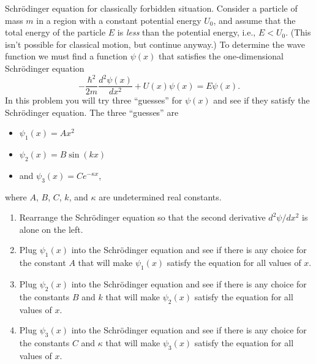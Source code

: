\begin{aproblem}{Schr\"odinger equation for classically forbidden
situation.}  
  Consider a particle of mass $m$ in a region with a constant
  potential energy $U_0$, and assume that the total energy of the
  particle $E$ is {\em less} than the potential energy, i.e., $E<U_0$.
  (This isn't possible for classical motion, but continue anyway.)  To
  determine the wave function we must find a function $\psi(x)$ that
  satisfies the one-dimensional Schr\"{o}dinger equation
  \[ -\frac{\hbar^2}{2m} \frac{d^2\psi(x)}{dx^2} + U(x)\psi(x) 
  = E\psi(x).  
  \]
  In this problem you will try three ``guesses'' for $\psi(x)$ and see
  if they satisfy the Schr\"{o}dinger equation. The three ``guesses''
  are
  \begin{itemize}
  \item $\psi_1(x) = Ax^2$ 
  \item $\psi_2(x) = B\sin(kx)$
  \item and $\psi_3(x) = Ce^{-\kappa x}$,
  \end{itemize}
  where $A$, $B$, $C$, $k$, and $\kappa$ are undetermined real
  constants.
  \begin{enumerate}
  \item Rearrange the Schr\"{o}dinger equation so that the second
    derivative $d^2\psi/dx^2$ is alone on the left.
  \item Plug $\psi_1(x)$ into the Schr\"{o}dinger equation and see if
    there is any choice for the constant $A$ that will make
    $\psi_1(x)$ satisfy the equation for all values of $x$.
  \item Plug $\psi_2(x)$ into the Schr\"{o}dinger equation and see if
    there is any choice for the constants $B$ and $k$ that will make
    $\psi_2(x)$ satisfy the equation for all values of $x$.
  \item Plug $\psi_3(x)$ into the Schr\"{o}dinger equation and see if
    there is any choice for the constants $C$ and $\kappa$ that will
    make $\psi_3(x)$ satisfy the equation for all values of $x$.
  \end{enumerate} 
\end{aproblem}

